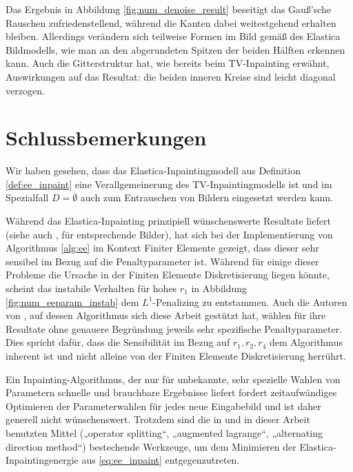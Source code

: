 \documentclass{mythesis}
\begin{document}
Das Ergebnis in Abbildung \ref{fig:num_denoise_result} beseitigt das Gauß'sche Rauschen zufriedenstellend, während die Kanten dabei weitestgehend erhalten bleiben.
Allerdings verändern sich teilweise Formen im Bild gemäß des Elastica Bildmodells, wie man an den abgerundeten Spitzen der beiden Hälften erkennen kann.
Auch die Gitterstruktur hat, wie bereits beim TV-Inpainting erwähnt, Auswirkungen auf das Resultat: die beiden inneren Kreise sind leicht diagonal verzogen.


\section{Schlussbemerkungen}


Wir haben gesehen, dass das Elastica-Inpaintingmodell aus Definition
\ref{def:ee_inpaint} eine Verallgemeinerung des TV-Inpaintingmodells ist und im
Spezialfall $D = \emptyset$ auch zum Entrauschen von Bildern eingesetzt werden
kann.

Während das Elastica-Inpainting prinzipiell wünschenswerte Resultate liefert (siehe auch \cite{timemarching}, \cite{tai2011fast} für entsprechende Bilder),
hat sich bei der Implementierung von Algorithmus \ref{alg:ee} im Kontext Finiter Elemente gezeigt, dass dieser sehr sensibel im Bezug auf die Penaltyparameter ist.
Während für einige dieser Probleme die Ursache in der Finiten Elemente Diskretisierung liegen könnte, scheint das instabile Verhalten für hohes $r_1$ in Abbildung \ref{fig:num_eeparam_instab} dem $L^1$-Penalizing zu entstammen.
Auch die Autoren von \cite{tai2011fast}, auf dessen Algorithmus sich diese Arbeit gestützt hat, wählen für ihre Resultate ohne genauere Begründung jeweils sehr spezifische Penaltyparameter.
Dies spricht dafür, dass die Sensibilität im Bezug auf $r_1, r_2, r_4$ dem Algorithmus inherent ist und nicht alleine von der Finiten Elemente Diskretisierung herrührt.

Ein Inpainting-Algorithmus, der nur für unbekannte, sehr spezielle Wahlen von Parametern schnelle und brauchbare Ergebnisse liefert fordert zeitaufwändiges Optimieren der Parameterwahlen für jedes neue Eingabebild und ist daher generell nicht wünschenswert.
Trotzdem sind die in \cite{tai2011fast} und in dieser Arbeit benutzten Mittel („operator splitting“, „augmented lagrange“, „alternating direction method“) bestechende Werkzeuge, um dem Minimieren der Elastica-Inpaintingenergie aus \eqref{eq:ee_inpaint} entgegenzutreten.
\end{document}
